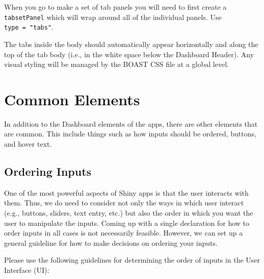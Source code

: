 \documentclass[]{book}
\begin{document}
When you go to make a set of tab panels you will need to first create a \texttt{tabsetPanel} which will wrap around all of the individual panels. Use \texttt{type\ =\ "tabs"}.

The tabs inside the body should automatically appear horizontally and along the top of the tab body (i.e., in the white space below the Dashboard Header). Any visual styling will be managed by the BOAST CSS file at a global level.

\hypertarget{common-elements}{%
\section{Common Elements}\label{common-elements}}

In addition to the Dashboard elements of the apps, there are other elements that are common. This include things such as how inputs should be ordered, buttons, and hover text.

\hypertarget{ordering-inputs}{%
\subsection{Ordering Inputs}\label{ordering-inputs}}

One of the most powerful aspects of Shiny apps is that the user interacts with them. Thus, we do need to consider not only the ways in which user interact (e.g., buttons, sliders, text entry, etc.) but also the order in which you want the user to manipulate the inputs. Coming up with a single declaration for how to order inputs in all cases is not necessarily feasible. However, we can set up a general guideline for how to make decisions on ordering your inputs.

Please use the following guidelines for determining the order of inputs in the User Interface (UI):
\end{document}
